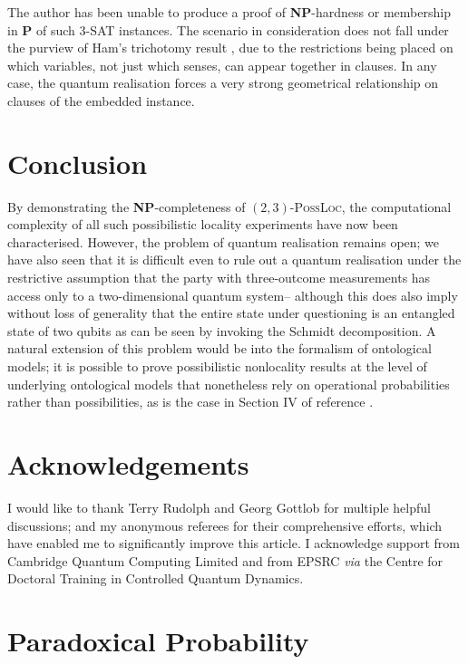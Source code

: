 \documentclass[reprint]{revtex4-1}
\theoremstyle{definition}
\begin{document}
The author has been unable to produce a proof of \textbf{NP}-hardness or membership in \textbf{P} of such \textsc{3-SAT} instances. The scenario in consideration does not fall under the purview of Ham's trichotomy result \cite{Ham2017}, due to the restrictions being placed on which variables, not just which senses, can appear together in clauses. In any case, the quantum realisation forces a very strong geometrical relationship on clauses of the embedded instance.
 
 \section{Conclusion}
 
 By demonstrating the \textbf{NP}-completeness of $(2,3)$-\textsc{PossLoc}, the computational complexity of all such possibilistic locality experiments have now been characterised. However, the problem of quantum realisation remains open; we have also seen that it is difficult even to rule out a quantum realisation under the restrictive assumption that the party with three-outcome measurements has access only to a two-dimensional quantum system-- although this does also imply without loss of generality that the entire state under questioning is an entangled state of two qubits as can be seen by invoking the Schmidt decomposition. A natural extension of this problem would be into the formalism of ontological models; it is possible to prove possibilistic nonlocality results at the level of underlying ontological models that nonetheless rely on operational probabilities rather than possibilities, as is the case in Section IV of reference  \cite{Jevt2015}.

\section*{Acknowledgements}

I would like to thank Terry Rudolph and Georg Gottlob for multiple helpful discussions; and my anonymous referees for their comprehensive efforts, which have enabled me to significantly improve this article. I acknowledge support from Cambridge Quantum Computing Limited and from EPSRC \emph{via} the Centre for Doctoral Training in Controlled Quantum Dynamics.

{}


\appendix
\iffalse
\section{Paradoxical Probability}
\end{document}
